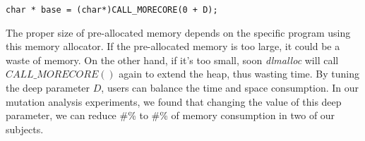 \begin{lstlisting}
char * base = (char*)CALL_MORECORE(0 + D);
\end{lstlisting}

The proper size of pre-allocated memory depends on the specific program using this memory allocator. If the pre-allocated memory is too large, it could be a waste of memory. On the other hand, if it's too small, soon \emph{dlmalloc} will call $CALL\_MORECORE()$ again to extend the heap, thus wasting time. By tuning the deep parameter $D$, users can balance the time and space consumption. In our mutation analysis experiments,  we found that changing the value of this deep parameter, we can reduce \#\% to \#\% of memory consumption in two of our subjects.

